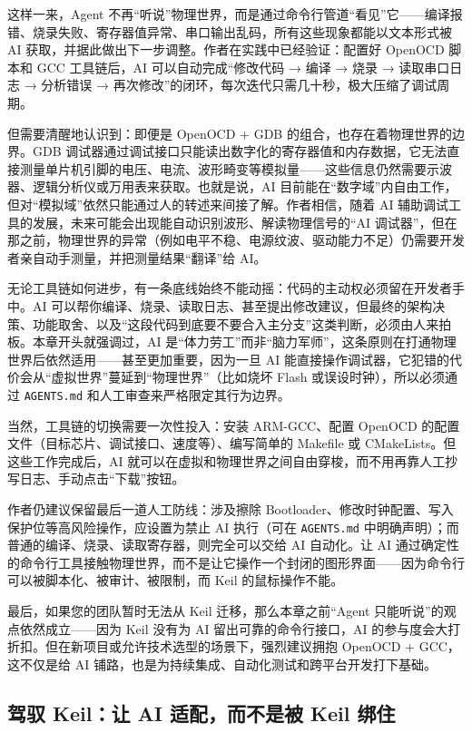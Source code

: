 这样一来，Agent 不再“听说”物理世界，而是通过命令行管道“看见”它——编译报错、烧录失败、寄存器值异常、串口输出乱码，所有这些现象都能以文本形式被 AI 获取，并据此做出下一步调整。作者在实践中已经验证：配置好 OpenOCD 脚本和 GCC 工具链后，AI 可以自动完成“修改代码 → 编译 → 烧录 → 读取串口日志 → 分析错误 → 再次修改”的闭环，每次迭代只需几十秒，极大压缩了调试周期。

但需要清醒地认识到：即便是 OpenOCD + GDB 的组合，也存在着物理世界的边界。GDB 调试器通过调试接口只能读出数字化的寄存器值和内存数据，它无法直接测量单片机引脚的电压、电流、波形畸变等模拟量——这些信息仍然需要示波器、逻辑分析仪或万用表来获取。也就是说，AI 目前能在“数字域”内自由工作，但对“模拟域”依然只能通过人的转述来间接了解。作者相信，随着 AI 辅助调试工具的发展，未来可能会出现能自动识别波形、解读物理信号的“AI 调试器”，但在那之前，物理世界的异常（例如电平不稳、电源纹波、驱动能力不足）仍需要开发者亲自动手测量，并把测量结果“翻译”给 AI。

无论工具链如何进步，有一条底线始终不能动摇：代码的主动权必须留在开发者手中。AI 可以帮你编译、烧录、读取日志、甚至提出修改建议，但最终的架构决策、功能取舍、以及“这段代码到底要不要合入主分支”这类判断，必须由人来拍板。本章开头就强调过，AI 是“体力劳工”而非“脑力军师”，这条原则在打通物理世界后依然适用——甚至更加重要，因为一旦 AI 能直接操作调试器，它犯错的代价会从“虚拟世界”蔓延到“物理世界”（比如烧坏 Flash 或误设时钟），所以必须通过 \texttt{AGENTS.md} 和人工审查来严格限定其行为边界。

当然，工具链的切换需要一次性投入：安装 ARM-GCC、配置 OpenOCD 的配置文件（目标芯片、调试接口、速度等）、编写简单的 Makefile 或 CMakeLists。但这些工作完成后，AI 就可以在虚拟和物理世界之间自由穿梭，而不用再靠人工抄写日志、手动点击“下载”按钮。

作者仍建议保留最后一道人工防线：涉及擦除 Bootloader、修改时钟配置、写入保护位等高风险操作，应设置为禁止 AI 执行（可在 \texttt{AGENTS.md} 中明确声明）；而普通的编译、烧录、读取寄存器，则完全可以交给 AI 自动化。让 AI 通过确定性的命令行工具接触物理世界，而不是让它操作一个封闭的图形界面——因为命令行可以被脚本化、被审计、被限制，而 Keil 的鼠标操作不能。

最后，如果您的团队暂时无法从 Keil 迁移，那么本章之前“Agent 只能听说”的观点依然成立——因为 Keil 没有为 AI 留出可靠的命令行接口，AI 的参与度会大打折扣。但在新项目或允许技术选型的场景下，强烈建议拥抱 OpenOCD + GCC，这不仅是给 AI 铺路，也是为持续集成、自动化测试和跨平台开发打下基础。

\subsection{驾驭 Keil：让 AI 适配，而不是被 Keil 绑住}

